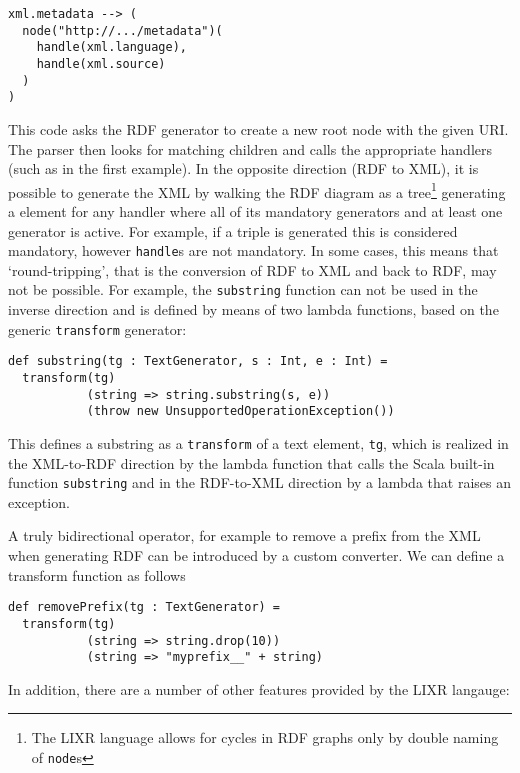 \documentclass{acm_proc_article-sp}
\begin{document}
\begin{verbatim}
xml.metadata --> (
  node("http://.../metadata")(
    handle(xml.language),
    handle(xml.source)
  )
)
\end{verbatim}

This code asks the RDF generator to create a new root node with the given URI. The parser
then looks for matching children and calls the appropriate handlers
(such as in the first example). In the opposite direction (RDF to XML), it is
possible to generate the XML by walking the RDF diagram as a tree\footnote{
The LIXR language allows for cycles in RDF graphs only by double naming of
{\tt node}s} generating a
element for any handler where all of its mandatory generators and at least one 
generator is active. For example, if a triple is generated this is considered
mandatory, however {\tt handle}s are not mandatory. In some cases, this means that
`round-tripping', that is the conversion of RDF to XML and back to RDF, may not
be possible. For example, the {\tt substring} function can not be used in the
inverse direction and is defined by means of two lambda functions, based on
the generic {\tt transform} generator:

\begin{verbatim}
def substring(tg : TextGenerator, s : Int, e : Int) =
  transform(tg)
           (string => string.substring(s, e))
           (throw new UnsupportedOperationException())
\end{verbatim}

This defines a substring as a {\tt transform} of a text element, {\tt tg}, which
is realized in the XML-to-RDF direction by the lambda function that calls the 
Scala built-in function {\tt substring} and in the RDF-to-XML direction by
a lambda that raises an exception.

A truly bidirectional operator, for example to remove a prefix from the XML when
generating RDF can be introduced by a custom converter.
We can define a transform function as follows

\begin{verbatim}
def removePrefix(tg : TextGenerator) =
  transform(tg)
           (string => string.drop(10))
           (string => "myprefix__" + string) 
\end{verbatim}

In addition, there are a number of other features provided by the LIXR langauge:
\end{document}
